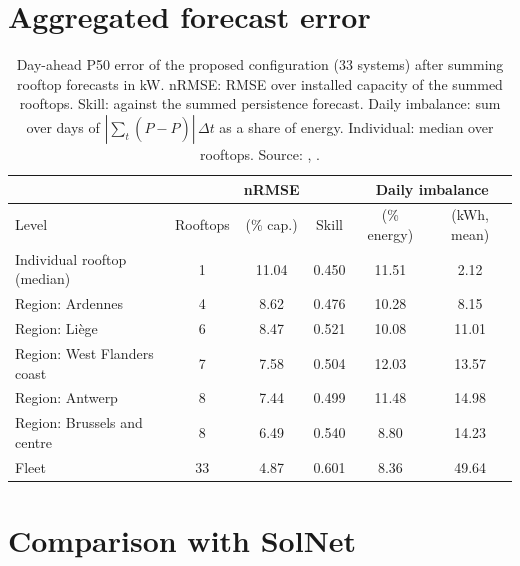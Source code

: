 \section{Aggregated forecast error}
\label{sec:s-aggregate}

\begin{table}[H]
\centering
\caption{Day-ahead P50 error of the proposed configuration (33 systems) after summing rooftop forecasts in kW. nRMSE: RMSE over installed capacity of the summed rooftops. Skill: against the summed persistence forecast. Daily imbalance: sum over days of $|\sum_t (P - \hat{P})|\,\Delta t$ as a share of energy. Individual: median over rooftops. Source: , .}
\label{tab:s-aggregate}
\small
\begin{tabularx}{\textwidth}{@{}>{\raggedright\arraybackslash}X c c c c c@{}}
\toprule
 & & nRMSE & & \multicolumn{2}{c}{Daily imbalance} \\
\cmidrule(l){5-6}
Level & Rooftops & (\% cap.) & Skill & (\% energy) & (kWh, mean) \\
\midrule
Individual rooftop (median) & 1 & 11.04 & 0.450 & 11.51 & 2.12 \\
Region: Ardennes & 4 & 8.62 & 0.476 & 10.28 & 8.15 \\
Region: Li\`ege & 6 & 8.47 & 0.521 & 10.08 & 11.01 \\
Region: West Flanders coast & 7 & 7.58 & 0.504 & 12.03 & 13.57 \\
Region: Antwerp & 8 & 7.44 & 0.499 & 11.48 & 14.98 \\
Region: Brussels and centre & 8 & 6.49 & 0.540 & 8.80 & 14.23 \\
Fleet & 33 & 4.87 & 0.601 & 8.36 & 49.64 \\
\bottomrule
\end{tabularx}
\end{table}

\section{Comparison with SolNet}
\label{sec:s-solnet}

